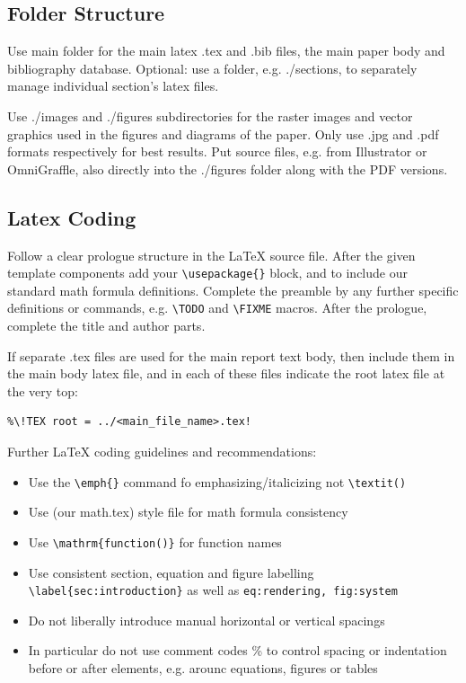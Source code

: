 \documentclass[11pt, a4paper,oneside,chapterprefix=false]{scrbook}
\newcommand{\FIXME}[1]{{\color{RED}{\textbf{FIX}: #1}}}
\begin{document}
\subsection*{Folder Structure}

Use main folder for the main latex .tex and .bib files, the main paper body and bibliography database. Optional: use a folder, e.g. ./sections, to separately manage individual section's latex files.

Use ./images and ./figures subdirectories for the raster images and vector graphics used in the figures and diagrams of the paper.
Only use .jpg and .pdf formats respectively for best results. Put source files, e.g. from Illustrator or OmniGraffle, also directly into the ./figures folder along with the PDF versions.

\subsection*{Latex Coding}

Follow a clear prologue structure in the LaTeX source file. After the given template components add your \verb!\usepackage{}! block, and \verb!! to include our standard math formula definitions. Complete the preamble by any further specific definitions or commands, e.g. \verb!\TODO! and \verb!\FIXME! macros. After the prologue, complete the title and author parts.

If separate .tex files are used for the main report text body, then include them in the main body latex file, and in each of these files indicate the root latex file at the very top:
\begin{verbatim}
%\!TEX root = ../<main_file_name>.tex!
\end{verbatim}

\noindent
Further LaTeX coding guidelines and recommendations:

\begin{itemize}
\item Use the \verb!\emph{}! command fo emphasizing/italicizing not \verb!\textit()!
\item Use (our math.tex) style file for math formula consistency
\item Use \verb!\mathrm{function()}!  for function names
\item Use consistent section, equation and figure labelling
\verb!\label{sec:introduction}! as well as \texttt{eq:rendering, fig:system}
\item Do not liberally introduce manual horizontal or vertical spacings
\item In particular do not use comment codes \% to control spacing or indentation before or after elements, e.g. arounc equations, figures or tables
\end{itemize}
\end{document}
